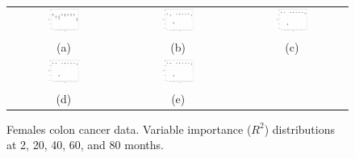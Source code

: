 \documentclass[12pt]{article}
\begin{document}
\begin{figure}[h!]
\centering
\begin{tabular}{c c c}
\includegraphics[width=0.3\textwidth]{vimp1_females.pdf} & 
\includegraphics[width=0.3\textwidth]{vimp10_females.pdf} & 
\includegraphics[width=0.3\textwidth]{vimp20_females.pdf}\\
 (a) & (b) & (c) \\
 \includegraphics[width=0.3\textwidth]{vimp30_females.pdf} & 
\includegraphics[width=0.3\textwidth]{vimp40_females.pdf} & 
\\
 (d) & (e) & 
 \end{tabular}
\caption{ Females colon cancer data. Variable importance ($R^2$) distributions at 2, 20, 40, 60, and 80 months.}
\label{fig:vimp_females}
\end{figure}
\end{document}
